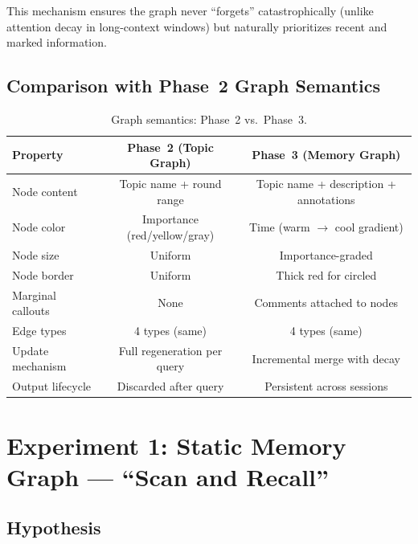 \documentclass[11pt,a4paper]{article}
\begin{document}
This mechanism ensures the graph never ``forgets'' catastrophically (unlike attention decay in long-context windows) but naturally prioritizes recent and marked information.

\subsection{Comparison with Phase~2 Graph Semantics}

\begin{table}[h]
\centering\footnotesize
\caption{Graph semantics: Phase~2 vs.\ Phase~3.}
\begin{tabular}{@{}lcc@{}}
\toprule
\textbf{Property} & \textbf{Phase~2 (Topic Graph)} & \textbf{Phase~3 (Memory Graph)} \\
\midrule
Node content        & Topic name + round range          & Topic name + description + annotations \\
Node color          & Importance (red/yellow/gray)      & Time (warm $\rightarrow$ cool gradient) \\
Node size           & Uniform                           & Importance-graded \\
Node border         & Uniform                           & Thick red for circled \\
Marginal callouts   & None                              & Comments attached to nodes \\
Edge types          & 4 types (same)                    & 4 types (same) \\
Update mechanism    & Full regeneration per query       & Incremental merge with decay \\
Output lifecycle    & Discarded after query              & Persistent across sessions \\
\bottomrule
\end{tabular}
\end{table}


\section{Experiment 1: Static Memory Graph — ``Scan and Recall''}

\subsection{Hypothesis}
\end{document}

